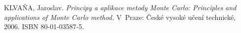 \documentclass[FM, RP]{tulthesis}
\begin{document}
\listoffigures

\listoftables



\begin{thebibliography}{1}

 KLVAŇA, Jaroslav. {\em Principy a aplikace metody Monte Carlo: Principles and applications of Monte Carlo method.} V~Praze: České vysoké učení technické, 2006. ISBN 80-01-03587-5.

\end{thebibliography}
\end{document}
